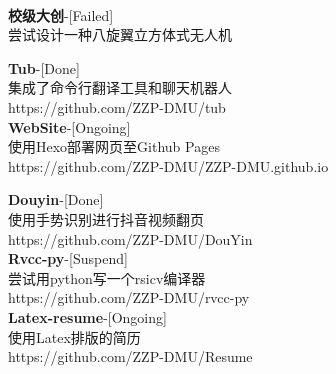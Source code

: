 \documentclass{ctexart}
\begin{document}
\begin{center}
    \hrulefill \\
    \begin{minipage}[t]{18em}
        \textbullet \textbf{校级大创}-[Failed] \\
        尝试设计一种八旋翼立方体式无人机
        
        \textbullet \textbf{Tub}-[Done] \\
        集成了命令行翻译工具和聊天机器人\\
        https://github.com/ZZP-DMU/tub \\
        \textbullet \textbf{WebSite}-[Ongoing] \\
        使用Hexo部署网页至Github Pages \\
        https://github.com/ZZP-DMU/ZZP-DMU.github.io \\
    \end{minipage}
    \begin{minipage}[t]{18em}
        \textbullet \textbf{Douyin}-[Done] \\
        使用手势识别进行抖音视频翻页 \\
        https://github.com/ZZP-DMU/DouYin \\
        \textbullet \textbf{Rvcc-py}-[Suspend] \\
        尝试用python写一个rsicv编译器 \\
        https://github.com/ZZP-DMU/rvcc-py \\
        \textbullet \textbf{Latex-resume}-[Ongoing] \\
        使用Latex排版的简历 \\
        https://github.com/ZZP-DMU/Resume \\
    \end{minipage}
\end{center}
\end{document}
